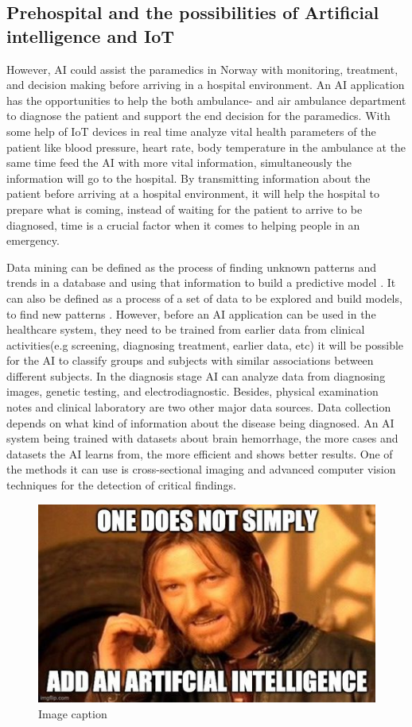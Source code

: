 \documentclass[fleqn,10pt]{wlscirep}
\begin{document}
\subsection{Prehospital and the possibilities of Artificial intelligence and IoT}
However, AI could assist the paramedics in Norway with monitoring, treatment, and decision making before arriving in a hospital environment. An AI application has the opportunities to help the both ambulance- and air ambulance department to diagnose the patient and support the end decision for the paramedics. With some help of IoT devices in real time analyze vital health parameters of the patient like blood pressure, heart rate, body temperature in the ambulance at the same time feed the AI with more vital information, simultaneously the information will go to the hospital. By transmitting information about the patient before arriving at a hospital environment, it will help the hospital to prepare what is coming, instead of waiting for the patient to arrive to be diagnosed, time is a crucial factor when it comes to helping people in an emergency. 

Data mining can be defined as the process of finding unknown patterns and trends in a database and using that information to build a predictive model \cite{Kilde17}. It can also be defined as a process of a set of data to be explored and build models, to find new patterns \cite{Kilde18}. However, before an AI application can be used in the healthcare system, they need to be trained from earlier data from clinical activities(e.g screening, diagnosing treatment, earlier data, etc) it will be possible for the AI to classify groups and subjects with similar associations between different subjects. In the diagnosis stage AI can analyze data from diagnosing images, genetic testing, and electrodiagnostic. Besides, physical examination notes and clinical laboratory are two other major data sources. Data collection depends on what kind of information about the disease being diagnosed. An AI system being trained with datasets about brain hemorrhage, the more cases and datasets the AI learns from, the more efficient and shows better results. One of the methods it can use is cross-sectional imaging and advanced computer vision techniques for the detection of critical findings.

\begin{figure}[!h]
\centering
\includegraphics[width=0.5\linewidth]{images/Bilde1}
\caption{Image caption}
\label{fig:figure_label}
\end{figure}
\end{document}
